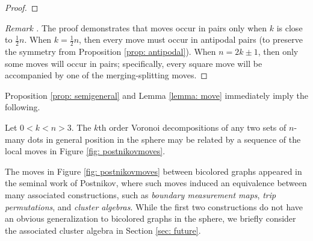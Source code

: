 \documentclass[11pt,oneside]{amsart}
\newenvironment{rethm}[1]
  {\renewcommand\theinnercustomthm{#1}\innercustomthm}
  {\endinnercustomthm}
\theoremstyle{definition}
\theoremstyle{remark}
\newenvironment{rem}{\refstepcounter{thm}\begin{proof}[Remark \emph{\thethm}]\renewcommand*{\qedsymbol}{\(\blacksquare\)}}{\end{proof}}
\numberwithin{equation}{section}
\begin{document}
\begin{proof}
%
%
%
\end{proof}

\begin{rem}
The proof demonstrates that moves occur in pairs only when $k$ is close to $\frac{1}{2}n$. When $k=\frac{1}{2}n$, then every move must occur in antipodal pairs (to preserve the symmetry from Proposition \ref{prop: antipodal}). When $n=2k\pm1$, then only some moves will occur in pairs; specifically, every square move will be accompanied by one of the merging-splitting moves.
\end{rem}


%
Proposition \ref{prop: semigeneral} and Lemma \ref{lemma: move} immediately imply the following.

\begin{rethm}{\ref{thm: move equiv}}
Let $0<k<n>3$. The $k$th order Voronoi decompositions of any two sets of $n$-many dots in general position in the sphere may be related by a sequence of the local moves in Figure \ref{fig: postnikovmoves}.
\end{rethm}

The moves in Figure \ref{fig: postnikovmoves} between bicolored graphs appeared in the seminal work of Postnikov, where such moves induced an equivalence between many associated constructions, such as \emph{boundary measurement maps}, \emph{trip permutations}, and \emph{cluster algebras}. While the first two constructions do not have an obvious generalization to bicolored graphs in the sphere, we briefly consider the associated cluster algebra in Section \ref{sec: future}. %
\end{document}
